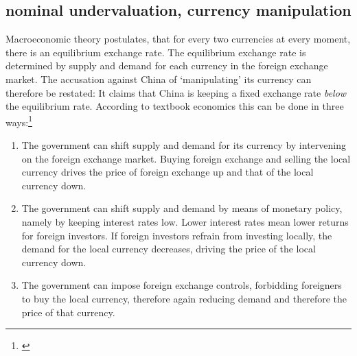 \documentclass[11pt]{article}
\begin{document}

\subsection{nominal undervaluation, currency manipulation}

Macroeconomic theory postulates, that for every two currencies at every 
moment, there is an equilibrium exchange rate. The equilibrium exchange 
rate is determined by supply and demand for each currency in the foreign 
exchange market. The accusation against China of `manipulating' its 
currency can therefore be restated: It claims that China is keeping a 
fixed exchange rate \emph{below} the equilibrium rate. According to 
textbook economics this can be done in three ways:\footnote{\cite[pp. 
514]{Krugman2008}}

\begin{enumerate}
\item{The government can shift supply and demand for its currency by intervening on the foreign exchange market. Buying foreign exchange and selling the local currency drives the price of foreign exchange up and that of the local currency down.}
\item{The government can shift supply and demand by means of monetary policy, namely by keeping interest rates low. Lower interest rates mean lower returns for foreign investors. If foreign investors refrain from investing locally, the demand for the local currency decreases, driving the price of the local currency down.}
\item{The government can impose foreign exchange controls, forbidding foreigners to buy the local currency, therefore again reducing demand and therefore the price of that currency.}
\end{enumerate}
\end{document}
